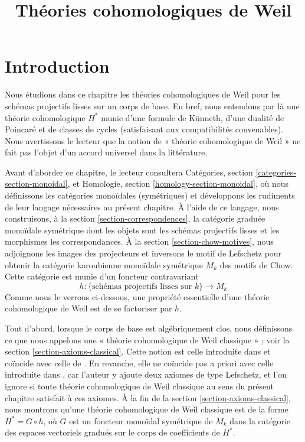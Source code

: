 

%


\title{Théories cohomologiques de Weil}


\maketitle

\label{section-phantom}

\tableofcontents



\section{Introduction}
\label{section-introduction}

\noindent
Nous étudions dans ce chapitre les théories cohomologiques de Weil pour les schémas
projectifs lisses sur un corps de base. En bref, nous entendons par là une théorie
cohomologique $H^*$ munie d'une formule de K\"unneth, d'une dualité de Poincar\'e
et de classes de cycles (satisfaisant aux compatibilités convenables). Nous
avertissons le lecteur que la notion de « théorie cohomologique de Weil »
ne fait pas l'objet d'un accord universel dans la littérature.

\medskip\noindent
Avant d'aborder ce chapitre, le lecteur consultera
Catégories, section \ref{categories-section-monoidal}, et
Homologie, section \ref{homology-section-monoidal}, où
nous définissons les catégories monoïdales (symétriques) et développons
les rudiments de leur langage nécessaires au présent chapitre.
À l'aide de ce langage, nous construisons, à la
section \ref{section-correspondences}, la catégorie graduée monoïdale
symétrique dont les objets sont les schémas projectifs lisses et
les morphismes les correspondances. À la section \ref{section-chow-motives},
nous adjoignons les images des projecteurs et inversons le motif de Lefschetz
pour obtenir la catégorie karoubienne monoïdale symétrique $M_k$
des motifs de Chow. Cette catégorie est munie d'un foncteur contravariant
$$
h : \{\text{schémas projectifs lisses sur }k\} \longrightarrow M_k
$$
Comme nous le verrons ci-dessous, une propriété essentielle d'une théorie
cohomologique de Weil est de se factoriser par $h$.

\medskip\noindent
Tout d'abord, lorsque le corps de base est algébriquement clos, nous définissons
ce que nous appelons une « théorie cohomologique de Weil classique » ;
voir la section \ref{section-axioms-classical}. Cette notion est
celle introduite dans \cite[Section 1.2]{Kleiman-cycles} et
coïncide avec celle de \cite[page 65]{Kleiman-motives}.
En revanche, elle ne coïncide pas a priori avec celle introduite dans
\cite[page 10]{Kleiman-standard}, car l'auteur y ajoute deux axiomes
de type Lefschetz, et l'on ignore si toute théorie cohomologique de Weil
classique au sens du présent chapitre satisfait à ces axiomes.
À la fin de la section \ref{section-axioms-classical}, nous montrons
qu'une théorie cohomologique de Weil classique est de la forme $H^* = G \circ h$,
où $G$ est un foncteur monoïdal symétrique de $M_k$ dans la catégorie
des espaces vectoriels gradués sur le corps de coefficients de $H^*$.

